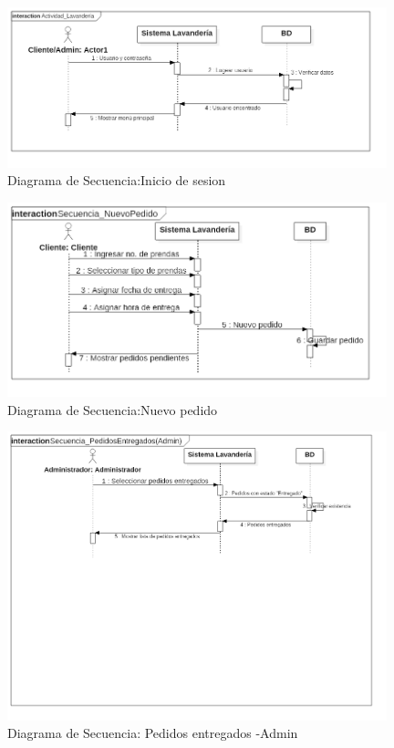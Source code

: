 \begin{figure}[htb]
\begin{center}
\includegraphics[width=11cm]{./imagenes/diagramas/Secuencia_InicioSesion.png}
\end{center}
\caption{Diagrama de Secuencia:Inicio de sesion}
\end{figure}

\newpage
\begin{figure}[htb]
\begin{center}
\includegraphics[width=11cm]{./imagenes/diagramas/Secuencia_NuevoPedido.png}
\end{center}
\caption{Diagrama de Secuencia:Nuevo pedido}
\end{figure}


\begin{figure}[htb]
\begin{center}
\includegraphics[width=11cm]{./imagenes/diagramas/Secuencia_PedidosEntregados(Admin).png}
\end{center}
\caption{Diagrama de Secuencia: Pedidos entregados -Admin}
\end{figure}
\newpage

